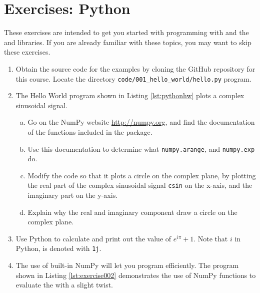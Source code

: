 \newpage
\section{Exercises: Python}

These exercises are intended to get you started with programming with
\emph{} and the \emph{} and
\emph{} libraries. If you are already
familiar with these topics, you may want to skip these exercises.


\begin{enumerate}
  \item Obtain the source code for the examples by cloning the GitHub
        repository for this course. Locate the
  directory \verb|code/001_hello_world/hello.py| program.


  \item The Hello World program shown in Listing \ref{lst:pythonhw} plots a complex sinusoidal signal.
        \begin{enumerate}[a)]
          \item Go on the NumPy website \url{http://numpy.org}, and find the documentation of the functions included in the package.
          \item Use this documentation to determine what \verb|numpy.arange|, and \verb|numpy.exp| do.
          \item Modify the code so that it plots a circle on the complex
                plane, by plotting the real part of the complex sinusoidal
                signal \verb|csin| on the x-axis, and the imaginary part on the
                y-axis.
          \item Explain why the real and imaginary component draw a circle on the complex plane.
        \end{enumerate}

  \item Use Python to calculate and print out the value of $e^{i \pi} + 1$. Note that $i$ in Python, is denoted
        with \verb|1j|.

  \item The use of built-in NumPy \emph{} will let you program
        efficiently. The program shown in Listing \ref{lst:exercise002}
        demonstrates the use of NumPy functions to evaluate the  with a slight twist.
        


\end{enumerate}
